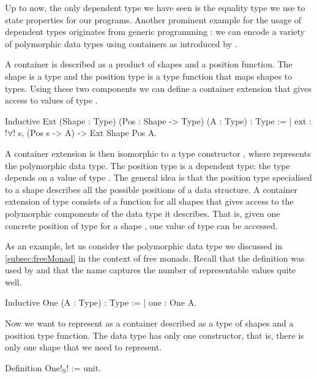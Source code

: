Up to now, the only dependent type we have seen is the equality type we use to state properties for our programs.
Another prominent example for the usage of dependent types originates from generic programming \citep{altenkirch2003generic,hinze2000new}: we can encode a variety of polymorphic data types using containers as introduced by \citet{abbott2003categories}.

A container is described as a product of shapes and a position function.
The shape is a type  and the position type  is a type function that maps shapes to types.
Using these two components we can define a container extension that gives access to values of type .

\begin{coqcode}
Inductive Ext (Shape : Type) (Pos : Shape -> Type) (A : Type) : Type :=
| ext : !$\forall$! s, (Pos s -> A) -> Ext Shape Pos A.
\end{coqcode}

A container extension  is then isomorphic to a type constructor , where  represents the polymorphic data type.
The position type  is a dependent type: the type depends on a value of type .
The general idea is that the position type specialised to a shape  describes all the possible positions of a data structure.
A container extension of type  consists of a function  for all shapes  that gives access to the polymorphic components of the data type it describes.
That is, given one concrete position of type  for a shape , one value of type  can be accessed.

As an example, let us consider the polymorphic data type  we discussed in \autoref{subsec:freeMonad} in the context of free monads.
Recall that the definition was used by \citet{swierstra2008data} and that the name captures the number of representable values quite well.

\begin{coqcode}
Inductive One (A : Type) : Type :=
| one : One A.
\end{coqcode}

Now we want to represent  as a container described as a type of shapes and a position type function.
The data type  has only one constructor, that is, there is only one shape that we need to represent.

\begin{coqcode}
Definition One!$_\text{S}$! := unit.
\end{coqcode}

